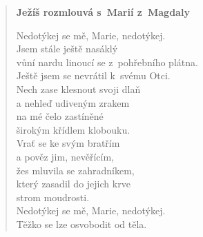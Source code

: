 \begin{verse}
\bigskip

\textbf{Ježíš rozmlouvá s Marií z Magdaly}

\medskip

Nedotýkej se mě, Marie, nedotýkej. \\
Jsem stále ještě nasáklý \\
vůní nardu linoucí se z pohřebního plátna. \\
Ještě jsem se nevrátil k svému Otci. \\
Nech zase klesnout svoji dlaň \\
a nehleď udiveným zrakem \\
na mé čelo zastíněné \\
širokým křídlem klobouku. \\
Vrať se ke svým bratřím \\
a pověz jim, nevěřícím, \\
žes mluvila se zahradníkem, \\
který zasadil do jejich krve \\
strom moudrosti. \\
Nedotýkej se mě, Marie, nedotýkej. \\
Těžko se lze osvobodit od těla.

\end{verse}

